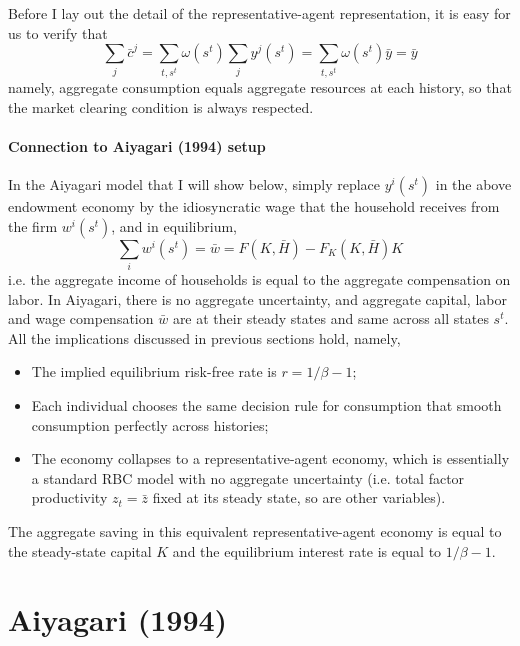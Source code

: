 \documentclass[12pt]{article}
\begin{document}
Before I lay out the detail of the representative-agent representation, it is easy for us to verify that
\begin{equation}
	\sum_j \bar{c}^j = \sum_{t, s^t} \omega(s^t) \sum_j y^j(s^t) = \sum_{t, s^t} \omega(s^t) \bar{y} = \bar{y} 
\end{equation}
namely, aggregate consumption equals aggregate resources at each history, so that the market clearing condition is always respected. 

\paragraph{Connection to Aiyagari (1994) setup} 

In the Aiyagari model that I will show below, simply replace $y^i(s^t)$ in the above endowment economy by the idiosyncratic wage that the household receives from the firm $w^i(s^t)$, and in equilibrium, 
\begin{equation}
	\sum_i w^i(s^t) = \bar{w} = F(K, \bar{H}) - F_K(K, \bar{H}) K
\end{equation}
i.e. the aggregate income of households is equal to the aggregate compensation on labor. In Aiyagari, there is no aggregate uncertainty, and aggregate capital, labor and wage compensation $\bar{w}$ are at their steady states and same across all states $s^t$. All the implications discussed in previous sections hold, namely,
\begin{itemize}
	\item The implied equilibrium risk-free rate is $r = 1/\beta -1$;
	\item Each individual chooses the same decision rule for consumption that smooth consumption perfectly across histories;
	\item The economy collapses to a representative-agent economy, which is essentially a standard RBC model with no aggregate uncertainty (i.e. total factor productivity $z_t = \bar{z}$ fixed at its steady state, so are other variables).
\end{itemize}
The aggregate saving in this equivalent representative-agent economy is equal to the steady-state capital $K$ and the equilibrium interest rate is equal to $1/\beta -1$.

\section{Aiyagari (1994)}
\end{document}
